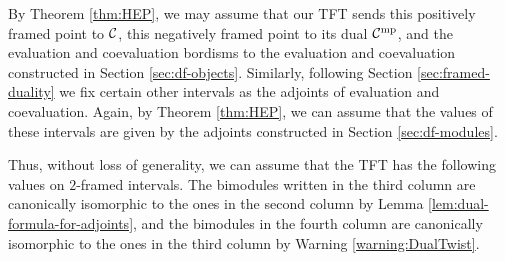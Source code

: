 \documentclass{amsart}
\begin{document}
By Theorem \ref{thm:HEP}, we may assume that our TFT sends this positively framed point to $\mathcal C$, this negatively framed point to its dual $\mathcal C^{\mathrm{mp}}$, and the evaluation and coevaluation bordisms to the evaluation and coevaluation constructed in Section \ref{sec:df-objects}.  Similarly, following Section \ref{sec:framed-duality} we fix certain other intervals as the adjoints of evaluation and coevaluation.  Again, by Theorem \ref{thm:HEP}, we can assume that the values of these intervals are given by the adjoints constructed in Section \ref{sec:df-modules}.  

Thus, without loss of generality, we can assume that the TFT has the following values on $2$-framed intervals.  The bimodules written in the third column are canonically isomorphic to the ones in the second column by Lemma \ref{lem:dual-formula-for-adjoints}, and the bimodules in the fourth column are canonically isomorphic to the ones in the third column by Warning \ref{warning:DualTwist}.
\end{document}
